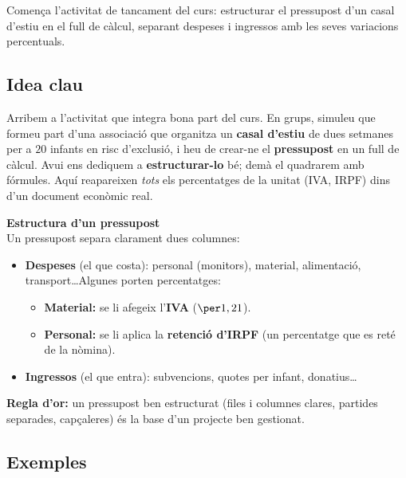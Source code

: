 %
{Comença l'activitat de tancament del curs: estructurar el pressupost d'un casal d'estiu en el full de càlcul, separant despeses i ingressos amb les seves variacions percentuals.}

\subsection{Idea clau}

Arribem a l'activitat que integra bona part del curs. En grups, simuleu que formeu part
d'una associació que organitza un \textbf{casal d'estiu} de dues setmanes per a $20$
infants en risc d'exclusió, i heu de crear-ne el \textbf{pressupost} en un full de
càlcul. Avui ens dediquem a \textbf{estructurar-lo} bé; demà el quadrarem amb fórmules.
Aquí reapareixen \emph{tots} els percentatges de la unitat (IVA, IRPF) dins d'un
document econòmic real.

\begin{idea}
\textbf{Estructura d'un pressupost}\\
Un pressupost separa clarament dues columnes:
\begin{itemize}[leftmargin=1.4em, itemsep=2pt]
  \item \textbf{Despeses} (el que costa): personal (monitors), material, alimentació,
        transport\dots Algunes porten percentatges:
        \begin{itemize}[leftmargin=1.2em, itemsep=1pt]
          \item \textbf{Material:} se li afegeix l'\textbf{IVA} ($\per 1,21$).
          \item \textbf{Personal:} se li aplica la \textbf{retenció d'IRPF} (un
                percentatge que es reté de la nòmina).
        \end{itemize}
  \item \textbf{Ingressos} (el que entra): subvencions, quotes per infant, donatius\dots
\end{itemize}
\textbf{Regla d'or:} un pressupost ben estructurat (files i columnes clares, partides
separades, capçaleres) és la base d'un projecte ben gestionat.
\end{idea}

\subsection{Exemples}

